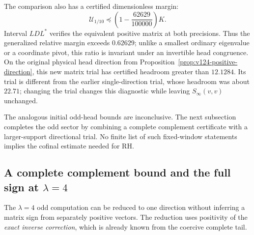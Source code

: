 \documentclass[11pt]{article}
\theoremstyle{remark}
\begin{document}
The comparison also has a certified dimensionless margin:
\begin{equation}\label{eq:v125-relative-margin}
 \mathcal U_{1/10}\preceq
 \left(1-\frac{62629}{100000}\right)K.
\end{equation}
Interval $LDL^*$ verifies the equivalent positive matrix at both
precisions.  Thus the generalized relative margin exceeds $0.62629$;
unlike a smallest ordinary eigenvalue or a coordinate pivot, this
ratio is invariant under an invertible head congruence.  On the
original physical head direction from
Proposition~\ref{prop:v124-positive-direction}, this new matrix trial
has certified headroom greater than $12.1284$.  Its trial is different
from the earlier single-direction trial, whose headroom was about
$22.71$; changing the trial changes this diagnostic while leaving
$S_\infty(v,v)$ unchanged.

The analogous initial odd-head bounds are inconclusive. The next
subsection completes the odd sector by combining a complete
complement certificate with a larger-support directional trial.
No finite list of such fixed-window statements implies the cofinal
estimate needed for RH.

\subsection*{A complete complement bound and the full sign at $\lambda=4$}

The $\lambda=4$ odd computation can be reduced to one direction
without inferring a matrix sign from separately positive vectors.
The reduction uses positivity of the \emph{exact inverse correction},
which is already known from the coercive complete tail.
\end{document}
